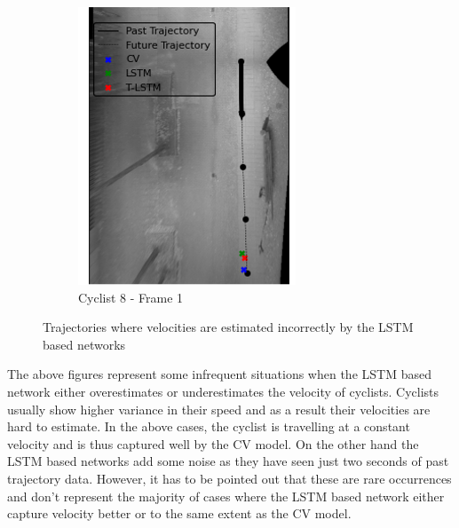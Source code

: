 \documentclass{article}
\begin{document}
\begin{figure}[H]
\begin{subfigure}{0.39\textwidth}
  \includegraphics[width=\linewidth]{quali_results/cyc-8-speed.png}
  \caption{Cyclist 8 - Frame 1}
  \label{fig:cyc8-speed}
\end{subfigure}
\caption{Trajectories where velocities are estimated incorrectly by the LSTM based networks}
\label{fig:cyc7&8}
\end{figure}

The above figures represent some infrequent situations when the LSTM based network either overestimates or underestimates the velocity of cyclists. Cyclists usually show higher variance in their speed and as a result their velocities are hard to estimate. In the above cases, the cyclist is travelling at a constant velocity and is thus captured well by the CV model. On the other hand the LSTM based networks add some noise as they have seen just two seconds of past trajectory data. However, it has to be pointed out that these are rare occurrences and don't represent the majority of cases where the LSTM based network either capture velocity better or to the same extent as the CV  model.
\end{document}
